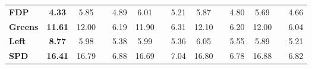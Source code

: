 \begin{table}[h!]
{\begin{minipage}{2\linewidth}
\begin{tabular*}{\linewidth}{@{\extracolsep{\fill}}lrrrrrrrrrrrrr}
{\bfseries FDP} & \multicolumn{1}{c}{{\bfseries 4.33}} & \multicolumn{1}{c}{{5.85}} & \multicolumn{1}{c}{{\cellcolor[HTML]{EAEAEA}{\textcolor[HTML]{000000}{1.53}}}} & \multicolumn{1}{c}{{4.89}} & \multicolumn{1}{c}{{6.01}} & \multicolumn{1}{c}{{\cellcolor[HTML]{E8E8E8}{\textcolor[HTML]{000000}{1.68}}}} & \multicolumn{1}{c}{{5.21}} & \multicolumn{1}{c}{{5.87}} & \multicolumn{1}{c}{{\cellcolor[HTML]{EAEAEA}{\textcolor[HTML]{000000}{1.54}}}} & \multicolumn{1}{c}{{4.80}} & \multicolumn{1}{c}{{5.69}} & \multicolumn{1}{c}{{\cellcolor[HTML]{ECECEC}{\textcolor[HTML]{000000}{1.36}}}} & \multicolumn{1}{c}{{4.66}} \\ 
{\bfseries Greens} & \multicolumn{1}{c}{{\bfseries 11.61}} & \multicolumn{1}{c}{{12.00}} & \multicolumn{1}{c}{{\cellcolor[HTML]{FAFAFA}{\textcolor[HTML]{000000}{0.39}}}} & \multicolumn{1}{c}{{6.19}} & \multicolumn{1}{c}{{11.90}} & \multicolumn{1}{c}{{\cellcolor[HTML]{FBFBFB}{\textcolor[HTML]{000000}{0.29}}}} & \multicolumn{1}{c}{{6.31}} & \multicolumn{1}{c}{{12.10}} & \multicolumn{1}{c}{{\cellcolor[HTML]{F8F8F8}{\textcolor[HTML]{000000}{0.49}}}} & \multicolumn{1}{c}{{6.20}} & \multicolumn{1}{c}{{12.00}} & \multicolumn{1}{c}{{\cellcolor[HTML]{F9F9F9}{\textcolor[HTML]{000000}{0.40}}}} & \multicolumn{1}{c}{{6.04}} \\ 
{\bfseries Left} & \multicolumn{1}{c}{{\bfseries 8.77}} & \multicolumn{1}{c}{{5.98}} & \multicolumn{1}{c}{{\cellcolor[HTML]{BBBBBB}{\textcolor[HTML]{000000}{-2.80}}}} & \multicolumn{1}{c}{{5.38}} & \multicolumn{1}{c}{{5.99}} & \multicolumn{1}{c}{{\cellcolor[HTML]{BBBBBB}{\textcolor[HTML]{000000}{-2.78}}}} & \multicolumn{1}{c}{{5.36}} & \multicolumn{1}{c}{{6.05}} & \multicolumn{1}{c}{{\cellcolor[HTML]{BCBCBC}{\textcolor[HTML]{000000}{-2.73}}}} & \multicolumn{1}{c}{{5.55}} & \multicolumn{1}{c}{{5.89}} & \multicolumn{1}{c}{{\cellcolor[HTML]{B9B9B9}{\textcolor[HTML]{000000}{-2.88}}}} & \multicolumn{1}{c}{{5.21}} \\ 
{\bfseries SPD} & \multicolumn{1}{c}{{\bfseries 16.41}} & \multicolumn{1}{c}{{16.79}} & \multicolumn{1}{c}{{\cellcolor[HTML]{FAFAFA}{\textcolor[HTML]{000000}{0.38}}}} & \multicolumn{1}{c}{{6.88}} & \multicolumn{1}{c}{{16.69}} & \multicolumn{1}{c}{{\cellcolor[HTML]{FBFBFB}{\textcolor[HTML]{000000}{0.28}}}} & \multicolumn{1}{c}{{7.04}} & \multicolumn{1}{c}{{16.80}} & \multicolumn{1}{c}{{\cellcolor[HTML]{FAFAFA}{\textcolor[HTML]{000000}{0.39}}}} & \multicolumn{1}{c}{{6.78}} & \multicolumn{1}{c}{{16.88}} & \multicolumn{1}{c}{{\cellcolor[HTML]{F9F9F9}{\textcolor[HTML]{000000}{0.46}}}} & \multicolumn{1}{c}{{6.82}} \\ 

\end{tabular*}
\end{minipage}}
\end{table}
